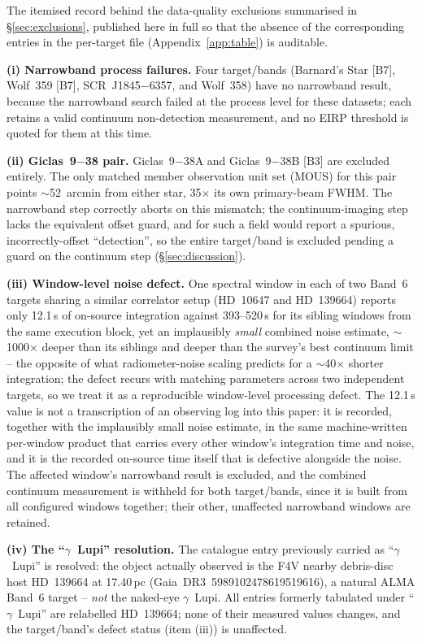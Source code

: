 \documentclass{openjournal}
\begin{document}
The itemised record behind the data-quality exclusions summarised in
\S\ref{sec:exclusions}, published here in full so that the absence of
the corresponding entries in the per-target file (Appendix~\ref{app:table}) is auditable.

\textbf{(i) Narrowband process failures.} Four target/bands
(Barnard's Star [B7], Wolf~359 [B7], SCR~J1845$-$6357, and Wolf~358)
have no narrowband result, because the narrowband search failed at the
process level for these datasets; each retains a valid continuum
non-detection measurement, and no EIRP threshold is quoted for them at
this time.

\textbf{(ii) Giclas~9$-$38 pair.} Giclas~9$-$38A and
Giclas~9$-$38B [B3] are excluded entirely. The only matched member
observation unit set (MOUS) for this pair points $\sim$52~arcmin from
either star, 35$\times$ its own primary-beam FWHM. The narrowband step
correctly aborts on this mismatch; the continuum-imaging step lacks
the equivalent offset guard, and for such a field would report a
spurious, incorrectly-offset ``detection'', so the entire target/band
is excluded pending a guard on the continuum step
(\S\ref{sec:discussion}).

\textbf{(iii) Window-level noise defect.} One spectral window in each
of two Band~6 targets sharing a similar correlator setup (HD~10647 and
HD~139664) reports only 12.1\,s of on-source integration against
393--520\,s for its sibling windows from the same execution block, yet
an implausibly \emph{small} combined noise estimate,
$\sim$1000$\times$ deeper than its siblings and deeper than the
survey's best continuum limit -- the opposite of what radiometer-noise
scaling predicts for a $\sim$40$\times$ shorter integration; the
defect recurs with matching parameters across two independent targets,
so we treat it as a reproducible window-level processing defect. The
12.1\,s value is not a transcription of an observing log into this
paper: it is recorded, together with the implausibly small noise
estimate, in the same machine-written per-window product that carries
every other window's integration time and noise, and it is the
recorded on-source time itself that is defective alongside the noise.
The affected window's narrowband result is excluded, and the combined
continuum measurement is withheld for both target/bands, since it is
built from all configured windows together; their other, unaffected
narrowband windows are retained.

\textbf{(iv) The ``$\gamma$~Lupi'' resolution.} The catalogue entry
previously carried as ``$\gamma$~Lupi'' is resolved: the object
actually observed is the F4V nearby debris-disc host HD~139664 at
17.40\,pc (Gaia~DR3~5989102478619519616), a natural ALMA Band~6
target -- \emph{not} the naked-eye $\gamma$~Lupi. All entries formerly
tabulated under ``$\gamma$~Lupi'' are relabelled HD~139664; none of
their measured values changes, and the target/band's defect status
(item (iii)) is unaffected.
\end{document}
